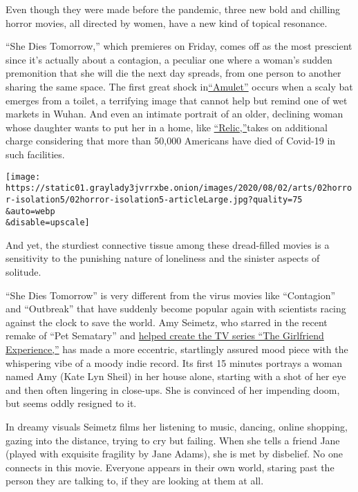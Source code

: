 Even though they were made before the pandemic, three new bold and
chilling horror movies, all directed by women, have a new kind of
topical resonance.

``She Dies Tomorrow,'' which premieres on Friday, comes off as the most
prescient since it's actually about a contagion, a peculiar one where a
woman's sudden premonition that she will die the next day spreads, from
one person to another sharing the same space. The first great shock
in\href{https://www.nytimes3xbfgragh.onion/2020/07/22/movies/amulet-review.html}{``Amulet''}
occurs when a scaly bat emerges from a toilet, a terrifying image that
cannot help but remind one of wet markets in Wuhan. And even an intimate
portrait of an older, declining woman whose daughter wants to put her in
a home, like
\href{https://www.nytimes3xbfgragh.onion/2020/07/09/movies/relic-review-a-haunted-house-and-a-clouded-mind.html}{``Relic,''}takes
on additional charge considering that more than 50,000 Americans have
died of Covid-19 in such facilities.

\texttt{[image: https://static01.graylady3jvrrxbe.onion/images/2020/08/02/arts/02horror-isolation5/02horror-isolation5-articleLarge.jpg?quality=75\\\&auto=webp\\\&disable=upscale]}

And yet, the sturdiest connective tissue among these dread-filled movies
is a sensitivity to the punishing nature of loneliness and the sinister
aspects of solitude.

``She Dies Tomorrow'' is very different from the virus movies like
``Contagion'' and ``Outbreak'' that have suddenly become popular again
with scientists racing against the clock to save the world. Amy Seimetz,
who starred in the recent remake of ``Pet Sematary'' and
\href{https://www.nytimes3xbfgragh.onion/2016/04/03/arts/television/starz-the-girlfriend-experience.html}{helped
create the TV series ``The Girlfriend Experience,''} has made a more
eccentric, startlingly assured mood piece with the whispering vibe of a
moody indie record. Its first 15 minutes portrays a woman named Amy
(Kate Lyn Sheil) in her house alone, starting with a shot of her eye and
then often lingering in close-ups. She is convinced of her impending
doom, but seems oddly resigned to it.

In dreamy visuals Seimetz films her listening to music, dancing, online
shopping, gazing into the distance, trying to cry but failing. When she
tells a friend Jane (played with exquisite fragility by Jane Adams), she
is met by disbelief. No one connects in this movie. Everyone appears in
their own world, staring past the person they are talking to, if they
are looking at them at all.

